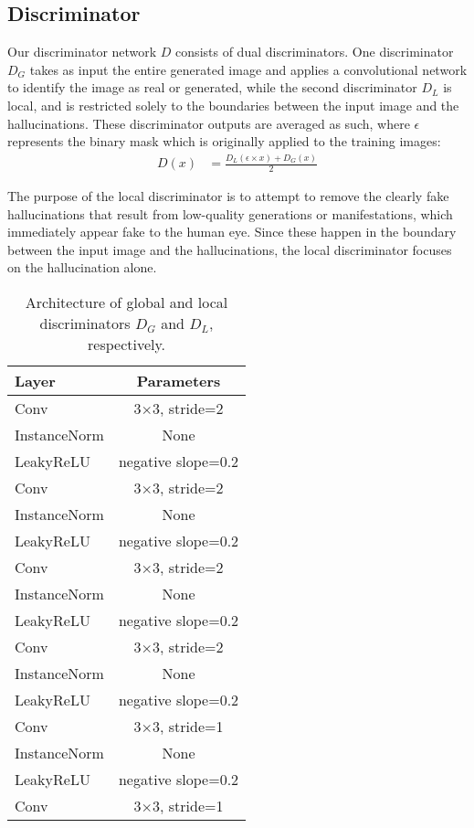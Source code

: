 \documentclass{article}
\begin{document}
\subsection{Discriminator}
Our discriminator network $D$ consists of dual discriminators. One discriminator $D_G$ takes as input the entire generated image and applies a convolutional network to identify the image as real or generated, while the second discriminator $D_L$ is local, and is restricted solely to the boundaries between the input image and the hallucinations. These discriminator outputs are averaged as such, where $\epsilon$ represents the binary mask which is originally applied to the training images: 
\begin{align}
	D(x) &= \frac{D_L(\epsilon \times x) + D_G(x)}{2}
\end{align}

The purpose of the local discriminator is to attempt to remove the clearly fake hallucinations that result from low-quality generations or manifestations, which immediately appear fake to the human eye. Since these happen in the boundary between the input image and the hallucinations, the local discriminator focuses on the hallucination alone.

\begin{table}[h] 
  \centering  
    \begin{tabular}{lc}  
    \hline
    \textbf{Layer} & \textbf{Parameters}\\ 
    \hline \hline
      Conv & 3$\times$3, stride=2 \\
    \hline
      InstanceNorm & None \\
    \hline
      LeakyReLU & negative slope=0.2 \\
    \hline
      Conv & 3$\times$3, stride=2 \\
    \hline
      InstanceNorm & None \\
    \hline
      LeakyReLU & negative slope=0.2 \\
    \hline
      Conv & 3$\times$3, stride=2 \\
    \hline
      InstanceNorm & None \\
    \hline
      LeakyReLU & negative slope=0.2 \\
    \hline
      Conv & 3$\times$3, stride=2 \\
    \hline
      InstanceNorm & None \\
    \hline
      LeakyReLU & negative slope=0.2 \\
    \hline
      Conv & 3$\times$3, stride=1 \\
    \hline
      InstanceNorm & None \\
    \hline
      LeakyReLU & negative slope=0.2 \\
    \hline
      Conv & 3$\times$3, stride=1 \\
    \hline
    \end{tabular}
  
  \caption{Architecture of global and local discriminators $D_G$ and $D_L$, respectively.} 
  \label{tab:3}
\end{table}
\end{document}
